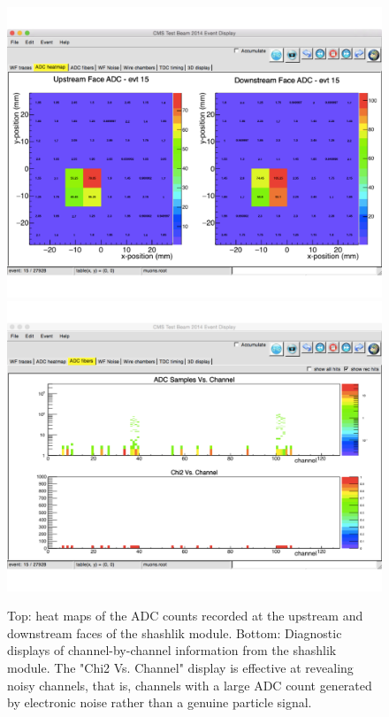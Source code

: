 \begin{figure}[h]\centering
\includegraphics[width=0.85\linewidth]{figures/CMS/Upgrade/MuonHeatMap.pdf}\\
\vspace{-1cm}
\includegraphics[width=0.85\linewidth]{figures/CMS/Upgrade/HealthyPulses.pdf}
\caption{Top: heat maps of the ADC counts recorded at the upstream and downstream faces of the shashlik module. Bottom: Diagnostic displays of channel-by-channel information from the shashlik module. The "Chi2 Vs. Channel" display is effective at revealing noisy channels, that is, channels with a large ADC count generated by electronic noise rather than a genuine particle signal.}
\label{fig:HeatMaps}
\end{figure}
